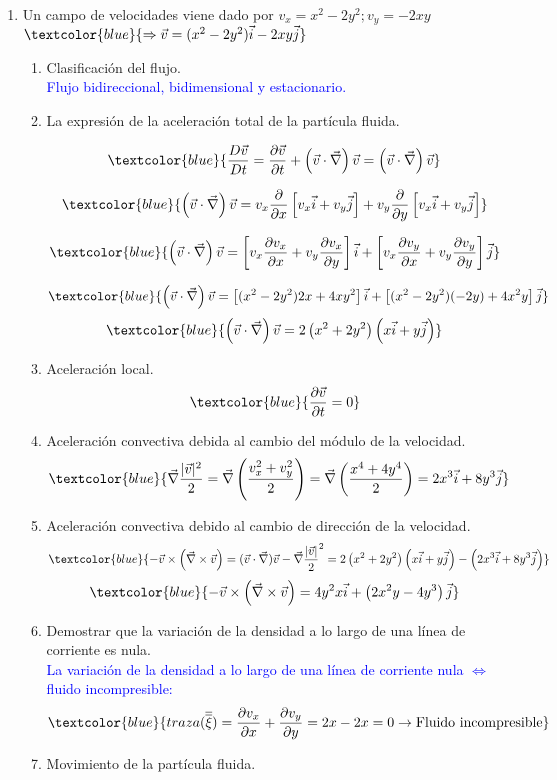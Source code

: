 \begin{enumerate}
	\item Un campo de velocidades viene dado por $v_x=x^2-2y^2; v_y=-2xy$
	$\textcolor{blue}{\Rightarrow \vec{v}=(x^2-2y^2)\vec{i}-2xy\vec{j}}$
	\begin{enumerate}
		\item Clasificación del flujo.\\
		\textcolor{blue}{Flujo bidireccional, bidimensional y estacionario.}
		\item La expresión de la aceleración total de la partícula fluida.
	
		\[	\textcolor{blue}{\dfrac{D\vec{v}}{Dt}=\dfrac{\partial\vec{v}}{\partial t}+\left(\vec{v}\cdot\vec{\nabla}\right)\vec{v}=\left(\vec{v}\cdot\vec{\nabla}\right)\vec{v}}\]
		
		\[\textcolor{blue}{\left(\vec{v}\cdot\vec{\nabla}\right)\vec{v}=v_x\dfrac{\partial}{\partial x}\left[v_x\vec{i}+v_y\vec{j}\right]+v_y\dfrac{\partial}{\partial y}\left[v_x\vec{i}+v_y\vec{j}\right]}\]
		
		\[\textcolor{blue}{\left(\vec{v}\cdot\vec{\nabla}\right)\vec{v}=\left[v_x\dfrac{\partial v_x}{\partial x} +v_y\dfrac{\partial v_x}{\partial y}\right]\vec{i}+\left[v_x\dfrac{\partial v_y}{\partial x} +v_y\dfrac{\partial v_y}{\partial y}\right]\vec{j}}\]
		
		\[\textcolor{blue}{\left(\vec{v}\cdot\vec{\nabla}\right)\vec{v}=\left[(x^2-2y^2)2x+4xy^2\right]\vec{i}+\left[(x^2-2y^2)(-2y)+4x^2y\right]\vec{j}}\]
		\[\textcolor{blue}{\left(\vec{v}\cdot\vec{\nabla}\right)\vec{v}=2\left(x^2+2y^2\right)\left(x\vec{i}+y\vec{j}\right)}\]
		\item Aceleración local.
		\[\textcolor{blue}{\dfrac{\partial \vec{v}}{\partial t}=0}\]
		\item Aceleración convectiva debida al cambio del módulo de la velocidad.
		\[\textcolor{blue}{\vec{\nabla}\dfrac{|\vec{v}|^2}{2}=\vec{\nabla}\left(\dfrac{v_x^2+v_y^2}{2}\right)=\vec{\nabla}\left(\dfrac{x^4+4y^4}{2}\right)=2x^3\vec{i}+8y^3\vec{j}}\]
		\item Aceleración convectiva debido al cambio de dirección de la velocidad.
			\[\textcolor{blue}{-\vec{v} \times \left(\vec{\nabla}\times\vec{v}\right)=(\vec{v} \cdot\vec{\nabla})\vec{v}-\vec{\nabla}\dfrac{|\vec{v}|}{2}^2=2\left(x^2+2y^2\right)\left(x\vec{i}+y\vec{j}\right)-\left(2x^3\vec{i}+8y^3\vec{j}\right)}\]
			\[\textcolor{blue}{-\vec{v} \times \left(\vec{\nabla}\times\vec{v}\right)=4y^2x\vec{i}+\left(2x^2y-4y^3\right)\vec{j}}\]
		\item Demostrar que la variación de la densidad a lo largo de una línea de corriente es nula.\\
		\textcolor{blue}{La variación de la densidad a lo largo de una línea de corriente nula $\Leftrightarrow$ fluido incompresible:}
		\[\textcolor{blue}{traza(\overline{\overline{\xi}})=\dfrac{\partial v_x}{\partial x}+\dfrac{\partial v_y}{\partial y}=2x-2x=0 \rightarrow \text{Fluido incompresible}}\]
		\item  Movimiento de la partícula fluida.
		

\end{enumerate}
\end{enumerate}
